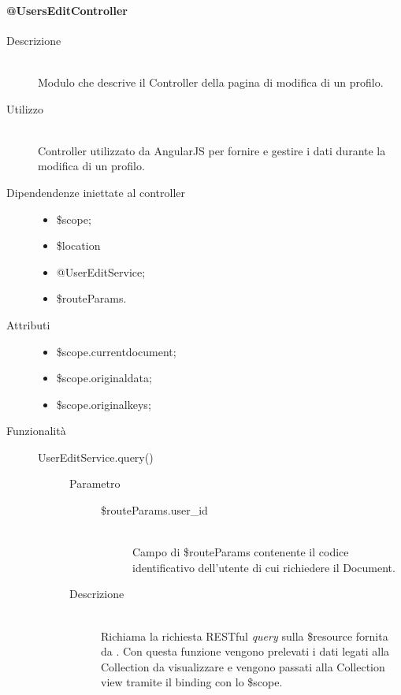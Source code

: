 \paragraph{@UsersEditController}
\begin{description}
 \item[Descrizione] \hfill \\
 Modulo che descrive il Controller della pagina di modifica di un profilo.
 
 \item[Utilizzo] \hfill \\
 Controller utilizzato da AngularJS per fornire e gestire i dati durante la modifica di un profilo.
 
 \item[Dipendendenze iniettate al controller] \hfill
 \begin{itemize}
  \item \$scope;
  \item \$location
  \item @UserEditService;
  \item \$routeParams.
  
 \end{itemize}
 
 \item[Attributi] \hfill
 \begin{itemize}
    \item  \$scope.current\textunderscore document;
    \item  \$scope.original\textunderscore data;
    \item  \$scope.original\textunderscore keys;
 \end{itemize}
 
 \item[Funzionalità] \hfill
 \begin{description}
  \item[UserEditService.query()] \hfill
  \begin{description}
  	\item[Parametro] \hfill 
  		\begin{description}
  			\item[\$routeParams.user\_id] \hfill \\
  			Campo di \$routeParams contenente il codice identificativo dell'utente di cui richiedere il Document.
       \end{description}
  	\item[Descrizione] \hfill \\
    Richiama la richiesta RESTful \textit{query} sulla \$resource fornita da .
  Con questa funzione vengono prelevati i dati legati alla Collection da visualizzare e vengono
  passati alla Collection view tramite il binding con lo \$scope. 
  

\end{description}
\end{description}
\end{description}
